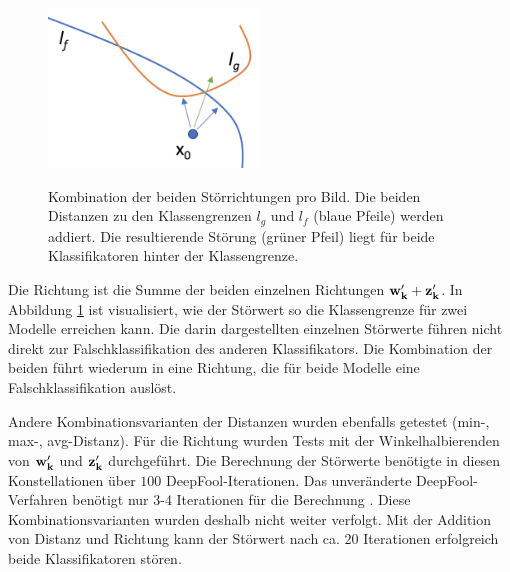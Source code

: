 \documentclass{FFHS_Thesis_Additions/ffhsthesis}
\begin{document}
\begin{figure}[h]
\caption{Kombination der beiden Störrichtungen pro Bild. Die beiden Distanzen zu den Klassengrenzen $l_g$ und $l_f$ (blaue Pfeile) werden addiert. Die resultierende Störung (grüner Pfeil) liegt für beide Klassifikatoren hinter der Klassengrenze.}
\centering
\includegraphics[width=0.5\textwidth]{./images/2d_multifool}
\label{fig_multifool}
\end{figure}

 Die Richtung ist die Summe der beiden einzelnen Richtungen $\bold{w'_k} + \bold{z'_k}$. In Abbildung \ref{fig_multifool} ist visualisiert, wie der Störwert so die Klassengrenze für zwei Modelle erreichen kann. Die darin dargestellten einzelnen Störwerte führen nicht direkt zur Falschklassifikation des anderen Klassifikators. Die Kombination der beiden führt wiederum in eine Richtung, die für beide Modelle eine Falschklassifikation auslöst.
 
 Andere Kombinationsvarianten der Distanzen wurden ebenfalls getestet (min-, max-, avg-Distanz). Für die Richtung wurden Tests mit der Winkelhalbierenden von $\bold{w'_k}$ und $\bold{z'_k}$ durchgeführt. Die Berechnung der Störwerte benötigte in diesen Konstellationen über $100$ DeepFool-Iterationen. Das unveränderte DeepFool-Verfahren benötigt nur $3$-$4$ Iterationen für die Berechnung \cite{moosavi-dezfooli_deepfool_2016}. Diese Kombinationsvarianten wurden deshalb nicht weiter verfolgt. Mit der Addition von Distanz und Richtung kann der Störwert nach ca. $20$ Iterationen erfolgreich beide Klassifikatoren stören.
 
\end{document}
